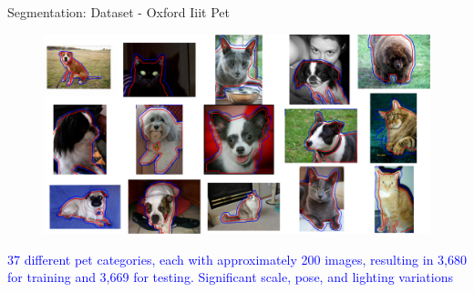 \documentclass[aspectratio=169]{beamer}
\let\oldcite\cite %
\renewcommand{\cite}[1]{{\tiny\oldcite{#1}}}
\begin{document}
\begin{frame}{Segmentation: Dataset - Oxford  Iiit Pet}
\begin{figure}
    \centering
    \includegraphics[width=0.7\linewidth]{Figures/oxfordData.pdf}
\end{figure}
\begin{center}
    \textcolor{blue}{37 different pet categories, each with approximately 200 images, resulting in 3,680 for training and 3,669 for testing. Significant scale, pose, and lighting variations \cite{parkhi12a}}
\end{center}
\end{frame}
\end{document}
